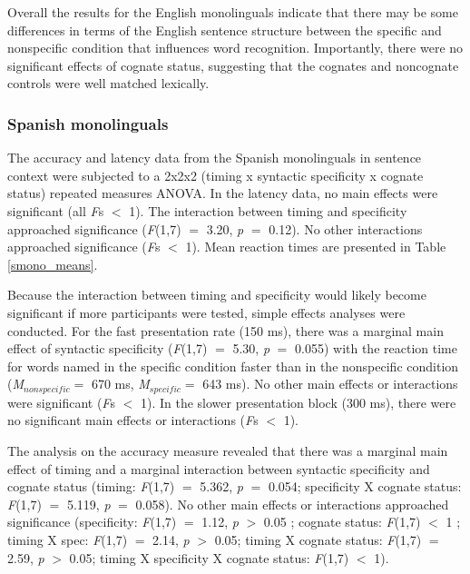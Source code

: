 Overall the results for the English monolinguals indicate that there may be some  differences in terms of the English sentence structure between the specific and nonspecific condition that influences word recognition. Importantly, there were no significant effects of cognate status, suggesting that the cognates and noncognate controls were well matched lexically.


\subsubsection{Spanish monolinguals}
The accuracy and latency data from the Spanish monolinguals in sentence context were subjected to a 2x2x2 (timing x syntactic specificity x cognate status) repeated measures ANOVA. In the latency data, no main effects were significant (all \textit{F}s $<$ 1). The interaction between timing and specificity approached significance (\textit{F}(1,7) $=$ 3.20, \textit{p} $=$ 0.12). No other interactions approached significance (\textit{F}s $<$ 1). Mean reaction times are presented in Table \ref{smono_means}.




Because the interaction between timing and specificity would likely become significant if more participants were tested, simple effects analyses were conducted. For the fast presentation rate (150 ms), there was a marginal main effect of syntactic specificity (\textit{F}(1,7) $=$ 5.30, \textit{p} $=$ 0.055) with the reaction time for words named in the specific condition faster than in the nonspecific condition (\textit{M}$_{nonspecific} =$ 670 ms, \textit{M}$_{specific} =$ 643 ms). No other main effects or interactions were significant (\textit{F}s $<$ 1). In the slower presentation block (300 ms), there were no significant main effects or interactions (\textit{F}s $<$ 1). 

The analysis on the accuracy measure revealed that there was a marginal main effect of timing and a marginal interaction between syntactic specificity and cognate status (timing: \textit{F}(1,7) $=$ 5.362, \textit{p} $=$ 0.054; specificity X cognate status: \textit{F}(1,7) $=$ 5.119, \textit{p} $=$ 0.058). No other main effects or interactions approached significance (specificity: \textit{F}(1,7) $=$  1.12, \textit{p} $>$ 0.05 ; cognate status:  \textit{F}(1,7) $<$ 1 ; timing X spec: \textit{F}(1,7) $=$ 2.14, \textit{p} $>$ 0.05; timing X cognate status: \textit{F}(1,7) $=$ 2.59, \textit{p} $>$ 0.05; timing X specificity X cognate status: \textit{F}(1,7) $<$ 1). 

